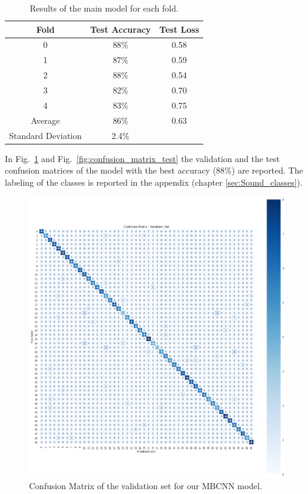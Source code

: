 \documentclass{article}
\begin{document}
\begin{sloppy}
\begin{table}[ht]
  \centering
  \caption{Results of the main model for each fold.}
  \label{tab:folds_results}
  \begin{tabular}{|c|c|c|}
    \hline
    Fold & Test Accuracy & Test Loss \\
    \hline
    0 & 88\% & 0.58 \\
    1 & 87\% & 0.59 \\
    2 & 88\% & 0.54 \\
    3 & 82\% & 0.70 \\
    4 & 83\% & 0.75 \\
    \hline
    Average & 86\% & 0.63 \\
    \hline
    Standard Deviation & 2.4\% &  \\
    \hline
  \end{tabular}
\end{table}

In Fig.~\ref{fig:confusion_matrix_val} and Fig.~\ref{fig:confusion_matrix_test} the
validation and the test confusion matrices of the model with the best accuracy (88\%) are reported. The
labeling of the classes is reported in the appendix (chapter \ref{sec:Sound_classes}).

\begin{figure}[ht]
  \centering
  \centerline{\includegraphics[width=\columnwidth]{Confusion_matrix_val.png}}
  \caption{Confusion Matrix of the validation set for our MBCNN model.}
  \label{fig:confusion_matrix_val}
\end{figure}


\end{sloppy}
\end{document}
